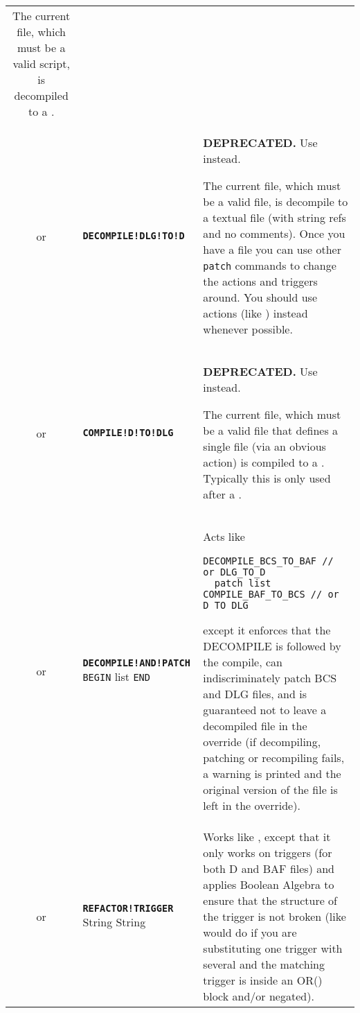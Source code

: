 \documentclass{article}
\def\ttref#1{\ahrefloc{#1}{\tt #1}}
\def\DEFINE#1{{\tt \bf #1}\label{#1}\index{#1}}
\def\t#1{{\tt #1}}
\def\Slist{{\color{red} list }}
\begin{document}
\begin{tabular}{cp{10in}|p{10in}}
  The current file, which must be a valid \ttref{BCS} script, is decompiled
  to a \ttref{BAF}. \\
or & \DEFINE{DECOMPILE!DLG!TO!D} &
\textbf{DEPRECATED.} Use \ttref{DECOMPILE!AND!PATCH} instead.

  The current file, which must be a valid \ttref{DLG} file, is decompile
  to a textual \ttref{D} file (with string refs and no comments). Once you
  have a \ttref{D} file you can use other \t{patch} commands to change the
  actions and triggers around. You should use \ttref{D} actions (like
  \ttref{REPLACE!ACTION!TEXT}) instead whenever possible.  \\
or & \DEFINE{COMPILE!D!TO!DLG} &
\textbf{DEPRECATED.} Use \ttref{DECOMPILE!AND!PATCH} instead.

  The current file, which must be a valid \ttref{D} file that defines
  a single \ttref{DLG} file (via an obvious \ttref{BEGIN} action) is
  compiled to a \ttref{DLG}. Typically this is only used after a
  \ttref{DECOMPILE!DLG!TO!D}.  \\
or & \DEFINE{DECOMPILE!AND!PATCH} \t{BEGIN} \ttref{patch} \Slist
  \t{END} &
  Acts like
\begin{verbatim}
DECOMPILE_BCS_TO_BAF // or DLG_TO_D
  patch list
COMPILE_BAF_TO_BCS // or D_TO_DLG
\end{verbatim}
  except it enforces that the DECOMPILE is followed by the compile,
  can indiscriminately patch BCS and DLG files, and is guaranteed not to leave
  a decompiled file in the override (if decompiling, patching or recompiling
  fails, a warning is printed and the original version of the file is left in
  the override).
\\
or & \DEFINE{REFACTOR!TRIGGER} \ttref{optcase} \ttref{optexact} String String &
  Works like \ttref{REPLACE!TEXTUALLY}, except that it only works on triggers
  (for both D and BAF files)
  and applies Boolean Algebra to ensure that the structure of the trigger is not
  broken (like \ttref{REPLACE!TEXTUALLY} would do if you are substituting one trigger with
  several and the matching trigger is inside an OR() block and/or negated).


\end{tabular}
\end{document}
